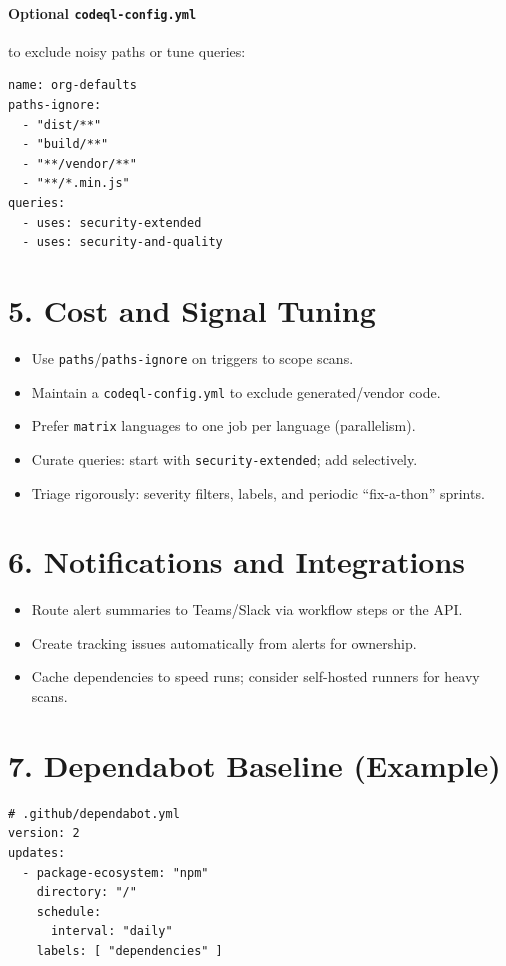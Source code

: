 \documentclass[11pt]{article}
\begin{document}
\paragraph{Optional \texttt{codeql-config.yml}} to exclude noisy paths or tune queries:
\begin{verbatim}
name: org-defaults
paths-ignore:
  - "dist/**"
  - "build/**"
  - "**/vendor/**"
  - "**/*.min.js"
queries:
  - uses: security-extended
  - uses: security-and-quality
\end{verbatim}

\section*{5. Cost and Signal Tuning}
\begin{itemize}
  \item Use \texttt{paths}/\texttt{paths-ignore} on triggers to scope scans.
  \item Maintain a \texttt{codeql-config.yml} to exclude generated/vendor code.
  \item Prefer \texttt{matrix} languages to one job per language (parallelism).
  \item Curate queries: start with \texttt{security-extended}; add selectively.
  \item Triage rigorously: severity filters, labels, and periodic ``fix-a-thon'' sprints.
\end{itemize}

\section*{6. Notifications and Integrations}
\begin{itemize}
  \item Route alert summaries to Teams/Slack via workflow steps or the API.
  \item Create tracking issues automatically from alerts for ownership.
  \item Cache dependencies to speed runs; consider self-hosted runners for heavy scans.
\end{itemize}

\section*{7. Dependabot Baseline (Example)}
\begin{verbatim}
# .github/dependabot.yml
version: 2
updates:
  - package-ecosystem: "npm"
    directory: "/"
    schedule:
      interval: "daily"
    labels: [ "dependencies" ]
\end{verbatim}
\end{document}
